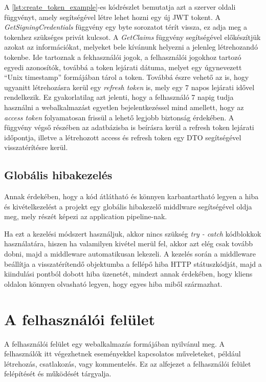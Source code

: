 A \ref{lst:create_token_example}-es kódrészlet bemutatja azt a szerver oldali függvényt, amely segítségével létre lehet hozni egy új JWT tokent.
A \textit{GetSigningCredentials} függvény egy byte sorozatot térít vissza, ez adja meg a tokenhez szükséges privát kulcsot.
A \textit{GetClaims} függvény segítségével előkészítjük azokat az információkat, melyeket bele kívánunk helyezni a jelenleg létrehozandó tokenbe.
Ide tartoznak a fekhasználói jogok, a felhasználói jogokhoz tartozó egyedi azonosítók, továbbá a token lejárati dátuma, melyet egy úgynevezett 
``Unix timestamp'' formájában tárol a token.
Továbbá észre vehető az is, hogy ugyanitt létrehozásra kerül egy \textit{refresh token} is, mely egy 7 napos lejárati idővel rendelkezik. Ez gyakorlatilag azt
jelenti, hogy a felhasználó 7 napig tudja használni a webalkalmazást egyetlen bejelentkezéssel mind amellett, hogy az \textit{access token} folyamatosan frissül
a lehető legjobb biztonság érdekében.
A függvény végső részében az adatbázisba is beírásra kerül a refresh token lejárati időpontja, illetve a létrehozott access és refresh token egy DTO segítségével
visszatérítésre kerül.

\subsection{Globális hibakezelés}

Annak érdekében, hogy a kód átlátható és könnyen karbantartható legyen a hiba és kivételkezelést a projekt egy globális hibakezelő middlware segítségével oldja meg, mely részét képezi az application pipeline-nak.

Ha ezt a kezelési módszert használjuk, akkor nincs szükség \textit{try - catch} kódblokkok használatára, hiszen ha valamilyen kivétel merül fel, akkor azt elég csak tovább dobni, majd a middleware automatikusan lekezeli. A kezelés során a middleware beállítja a visszatérítendő objektumba a fellépő hiba HTTP státuszkódját, majd a kiindulási pontból dobott hiba üzenetét, mindezt annak érdekében, hogy kliens oldalon könnyen olvasható legyen, hogy egyes hiba miből származhat.

\section{A felhasználói felület}

A felhasználói felület egy webalkalmazás formájában nyilvánul meg. A felhasználók itt végezhetnek eseményekkel kapcsolatos műveleteket, például létrehozás, csatlakozás, vagy kommentelés. Ez az alfejezet a felhasználói felület felépítését és működését tárgyalja.

